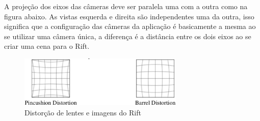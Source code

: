 A projeção dos eixos das câmeras deve ser paralela uma com a outra como na figura abaixo. As vistas esquerda e direita são independentes uma da outra, isso significa que a configuração das câmeras da aplicação é basicamente a mesma ao se utilizar uma câmera única, a diferença é a distância entre os dois eixos ao se criar uma cena para o Rift.

\begin{figure}[h]
  \centering
  \includegraphics[width=0.7\textwidth]
      {figuras/distorcao_rift.eps}
  \caption{Distorção de lentes e imagens do Rift}
  \label{coordenadas-rift}
\end{figure}
